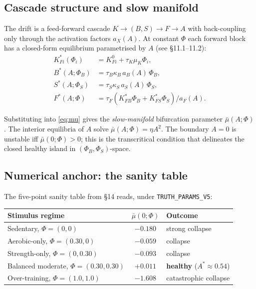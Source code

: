 \documentclass[11pt,a4paper]{article}
\theoremstyle{definition}
\begin{document}
\subsection{Cascade structure and slow manifold}

The drift is a feed-forward cascade $K \to (B,S) \to F \to A$ with back-coupling only through the activation factors $a_X(A)$. At constant $\Phi$ each forward block has a closed-form equilibrium parametrised by $A$ (see \cite{tech-guide-v5} \S{}11.1--11.2):
\begin{align}
K_{Fi}^*(\Phi_i) &= K_{Fi}^0 + \tau_K \mu_K \Phi_i, \label{eq:K-star}\\
B^*(A; \Phi_B)   &= \tau_B \kappa_B \, a_B(A) \, \Phi_B, \label{eq:B-star}\\
S^*(A; \Phi_S)   &= \tau_S \kappa_S \, a_S(A) \, \Phi_S, \label{eq:S-star}\\
F^*(A; \Phi)     &= \tau_F (K_{FB}^* \Phi_B + K_{FS}^* \Phi_S)/a_F(A). \label{eq:F-star}
\end{align}

Substituting into \eqref{eq:mu} gives the \emph{slow-manifold} bifurcation parameter $\bar\mu(A; \Phi)$. The interior equilibria of $A$ solve $\bar\mu(A; \Phi) = \eta A^2$. The boundary $A=0$ is unstable iff $\bar\mu(0; \Phi) > 0$; this is the transcritical condition that delineates the closed healthy island in $(\Phi_B, \Phi_S)$-space.

\subsection{Numerical anchor: the sanity table}

The five-point sanity table from \cite[Table 5]{tech-guide-v5} \S{}14 reads, under \texttt{TRUTH\_PARAMS\_V5}:

\begin{center}\small
\begin{tabular}{lcl}
\toprule
Stimulus regime & $\bar\mu(0; \Phi)$ & Outcome \\
\midrule
Sedentary,             $\Phi = (0, 0)$       & $-0.180$ & strong collapse \\
Aerobic-only,          $\Phi = (0.30, 0)$    & $-0.059$ & collapse \\
Strength-only,         $\Phi = (0, 0.30)$    & $-0.093$ & collapse \\
Balanced moderate,     $\Phi = (0.30, 0.30)$ & $+0.011$ & \textbf{healthy} ($A^* \approx 0.54$) \\
Over-training,         $\Phi = (1.0, 1.0)$   & $-1.608$ & catastrophic collapse \\
\bottomrule
\end{tabular}
\end{center}
\end{document}
